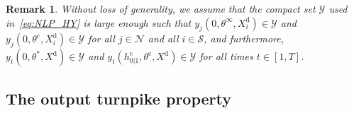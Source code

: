 \documentclass{article} %
\newtheorem{rem}{Remark}
\begin{document}
\begin{rem}\label{rem:set_Y}
	Without loss of generality, we assume that the compact set $\mathcal{Y}$ used in~\eqref{eq:NLP_HY} is large enough such that $y_j(0,\theta^\infty,X^\mathrm{d}_i)\in\mathcal{Y}$ and $y_j(0,\theta^\mathrm{c},X^\mathrm{d}_i)\in\mathcal{Y}$ for all $j\in\mathcal{N}$ and all $i\in\mathcal{S}$, and furthermore, $y_t(0,\theta^*,X^\mathrm{d})\in\mathcal{Y}$ and $y_t(h_{0|1}^\mathrm{c},\theta^\mathrm{c},X^\mathrm{d})\in\mathcal{Y}$ for all times $t\in[1,T]$.
\end{rem}


\subsection{The output turnpike property}\label{app:turnpike}
\end{document}
